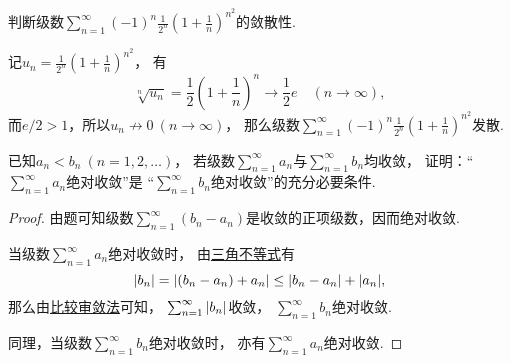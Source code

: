 \begin{example}
判断级数\(\sum_{n=1}^\infty (-1)^n \frac1{2^n} \left(1+\frac1n\right)^{n^2}\)的敛散性.
\begin{solution}
记\(u_n = \frac1{2^n} \left(1+\frac1n\right)^{n^2}\)，
有\[
	\sqrt[n]{u_n}
	= \frac12 \left(1+\frac1n\right)^n
	\to \frac12 e \quad(n\to\infty),
\]
而\(e/2>1\)，所以\(u_n \not\to 0\ (n\to\infty)\)，
那么级数\(\sum_{n=1}^\infty (-1)^n \frac1{2^n} \left(1+\frac1n\right)^{n^2}\)发散.
\end{solution}
\end{example}

\begin{example}
已知\(a_n < b_n\ (n=1,2,\dotsc)\)，
若级数\(\sum_{n=1}^\infty a_n\)与\(\sum_{n=1}^\infty b_n\)均收敛，
证明：“\(\sum_{n=1}^\infty a_n\)绝对收敛”是
“\(\sum_{n=1}^\infty b_n\)绝对收敛”的充分必要条件.
\begin{proof}
由题可知级数\(\sum_{n=1}^\infty (b_n - a_n)\)是收敛的正项级数，因而绝对收敛.

当级数\(\sum_{n=1}^\infty a_n\)绝对收敛时，
由\hyperref[theorem:不等式.三角不等式1]{三角不等式}有\[
	\abs{b_n} = \abs{(b_n - a_n) + a_n}
	\leq \abs{b_n - a_n} + \abs{a_n},
\]
那么由\hyperref[theorem:无穷级数.正项级数的比较审敛法]{比较审敛法}可知，
\(\sum_{n=1}^\infty \abs{b_n}\)收敛，
\(\sum_{n=1}^\infty b_n\)绝对收敛.

同理，当级数\(\sum_{n=1}^\infty b_n\)绝对收敛时，
亦有\(\sum_{n=1}^\infty a_n\)绝对收敛.
\end{proof}
\end{example}

